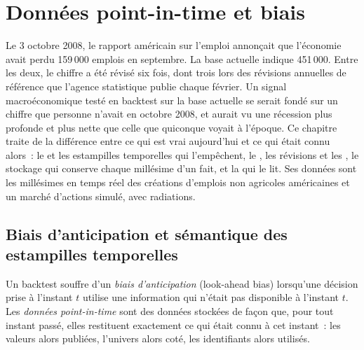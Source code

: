 \chapter{Données point-in-time et biais}\label{ch:rs:point-in-time-data-and-the-biases}

Le 3 octobre 2008, le rapport américain sur l'emploi annonçait que l'économie avait perdu 159\,000 emplois en septembre. La base actuelle indique
451\,000. Entre les deux, le chiffre a été révisé six fois, dont trois lors des révisions annuelles de référence que
l'agence statistique publie chaque février. Un signal macroéconomique testé en backtest sur
la base actuelle se serait fondé sur un chiffre que personne n'avait en octobre 2008, et aurait vu une récession plus profonde et plus nette
que celle que quiconque voyait à l'époque. Ce chapitre traite de la différence entre ce qui est vrai aujourd'hui et ce qui était connu alors~:
le  et les estampilles temporelles qui l'empêchent, le , les révisions et les , le stockage qui conserve
chaque millésime d'un fait, et la  qui le lit. Ses données sont les millésimes en temps réel des créations d'emplois non agricoles américaines et un
marché d'actions simulé, avec radiations.

\section{Biais d'anticipation et sémantique des estampilles temporelles}

\begin{definition}\label{def:rs:point-in-time-data-and-the-biases:lookahead}
Un backtest souffre d'un \emph{biais d'anticipation} (look-ahead bias) lorsqu'une décision prise à l'instant $t$ utilise une information qui n'était pas
disponible à l'instant $t$. Les \emph{données point-in-time} sont des données stockées de façon que, pour tout instant passé, elles
restituent exactement ce qui était connu à cet instant~: les valeurs alors publiées, l'univers alors coté, les identifiants alors
utilisés.
\end{definition}

